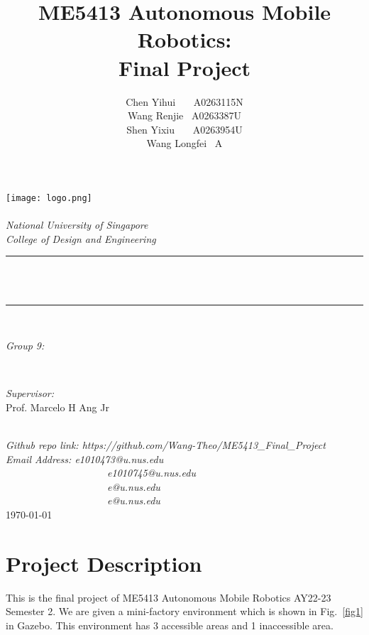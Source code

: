 \documentclass[hyperref]{article}
\title{ME5413 Autonomous Mobile Robotics: \\[0.5cm] Final Project}
\author{\textup{Chen Yihui \ \ \ A0263115N \\ Wang Renjie \ A0263387U \\ Shen Yixiu \ \ \ A0263954U \\ Wang Longfei \ A }}
\theoremstyle{nonumberplain}
\begin{document}
	\begin{titlepage}
		\center
		\newcommand{\HRule}{\rule{\linewidth}{0.5mm}}
		\texttt{[image: logo.png]}\\[1cm] 
		\quad\\[2cm]
		\textsl{\Large National University of Singapore}\\[0.5cm] 
		\textsl{\large College of Design and Engineering}\\[0.5cm]
		\makeatletter
		\HRule \\[0.4cm]
		{ \huge \bfseries \@title}\\[0.4cm] 
		\HRule \\[2cm]
		\begin{minipage}{0.4\textwidth}
			\begin{flushleft} \large
				\emph{Group 9:}\\
				\@author 
			\end{flushleft}
		\end{minipage}
		~
		\begin{minipage}{0.4\textwidth}
			\begin{flushright} \large
				\emph{Supervisor:} \\
				\textup{Prof. Marcelo H Ang Jr}
			\end{flushright}
		\end{minipage}\\[1cm]
		\makeatother
		{\large \emph{Github repo link: https://github.com/Wang-Theo/ME5413\_Final\_Project}}\\[0.5cm]
		{\large \emph{Email Address: e1010473@u.nus.edu \\	\ \ \ \ \ \ \ \ \ \ \ \ \ \ \ \ \ \ \ \ e1010745@u.nus.edu \\	\ \ \ \ \ \ \ \ \ \ \ \ \ \ \ \ \ \ \ \
		e@u.nus.edu \\	\ \ \ \ \ \ \ \ \ \ \ \ \ \ \ \ \ \ \ \
		e@u.nus.edu }}\\[0.5cm]
		{\large \today}\\[2cm] 
		\vfill 
	\end{titlepage}

\section{Project Description}
\hspace{1.0em}
This is the final project of ME5413 Autonomous Mobile Robotics AY22-23 Semester 2. We are given a mini-factory environment which is shown in Fig.~\ref{fig1} in Gazebo. This environment has 3 accessible areas and 1 inaccessible area.
\end{document}
